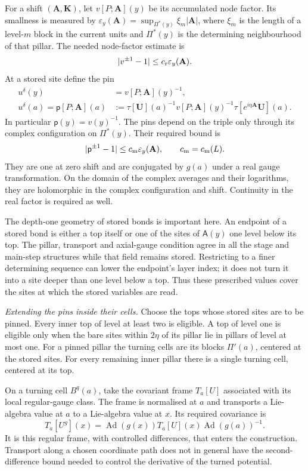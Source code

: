 \documentclass[11pt,letterpaper,reqno]{amsart}
\theoremstyle{definition}
\theoremstyle{remark}
\begin{document}
For a shift \((\mathbf A,\mathbf K)\), let
\(v[P;\mathbf A](y)\) be its accumulated node factor. Its smallness
is measured by
\(\varepsilon_y(\mathbf A)=\sup_{\Pi^*(y)}\xi_m|\mathbf A|\),
where \(\xi_m\) is the length of a level-\(m\) block in the
current units and \(\Pi^*(y)\) is the determining neighbourhood
of that pillar. The needed node-factor estimate is
\[
 |v^{\pm1}-1|\le c_{\rm r}\varepsilon_y(\mathbf A).
\]
At a stored site define the pin
\begin{equation}\label{eq:xrg-pinned-gauge}
 \begin{split}
 u^\delta(y)&=v[P;\mathbf A](y)^{-1},\\
 u^\delta(a)=\mathsf p[P;\mathbf A](a)
   &:=\tau[\mathbf U](a)^{-1}v[P;\mathbf A](y)^{-1}
                          \tau[e^{i\eta\mathbf A}\mathbf U](a).
 \end{split}
\end{equation}
In particular \(\mathsf p(y)=v(y)^{-1}\). The pins depend on
the triple only through its complex configuration on
\(\Pi^*(y)\). Their required bound is
\[
 |\mathsf p^{\pm1}-1|\le c_{\rm m}\varepsilon_y(\mathbf A),
                         \qquad c_{\rm m}=c_{\rm m}(L).
\]
They are one at zero shift and are conjugated by \(g(a)\) under
a real gauge transformation. On the domain of the complex
averages and their logarithms, they are holomorphic in the
complex configuration and shift. Continuity in the real factor
is required as well.

The depth-one geometry of stored bonds is important here. An
endpoint of a stored bond is either a top itself or one of the
sites of \(\mathsf A(y)\) one level below its top. The pillar,
transport and axial-gauge condition agree in all the stage and
main-step structures while that field remains stored. Restricting
to a finer determining sequence can lower the endpoint's layer
index; it does not turn it into a site deeper than one level
below a top. Thus these prescribed values cover the sites at
which the stored variables are read.

\emph{Extending the pins inside their cells.}
Choose the tops whose stored sites are to be pinned. Every inner
top of level at least two is eligible. A top of level one is
eligible only when the bare sites within \(2\eta\) of its pillar
lie in pillars of level at most one. For a pinned pillar the
turning cells are its blocks \(\Pi'(a)\), centered at the stored
sites. For every remaining inner pillar there is a single
turning cell, centered at its top.

On a turning cell \(B^q(a)\), take the covariant frame \(T_a[U]\)
associated with its local regular-gauge class. The frame is
normalised at \(a\) and transports a Lie-algebra value at \(a\)
to a Lie-algebra value at \(x\). Its required covariance is
\[
 T_a[U^g](x)
   =\operatorname{Ad}(g(x))T_a[U](x)
                              \operatorname{Ad}(g(a))^{-1}.
\]
It is this regular frame, with controlled differences, that enters
the construction. Transport along a chosen coordinate path does
not in general have the second-difference bound needed to control
the derivative of the turned potential.
\end{document}
